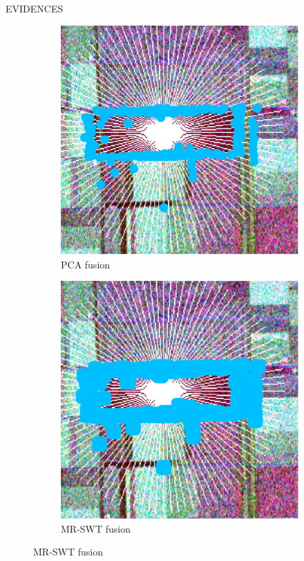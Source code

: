 \documentclass[final]{beamer}
\newlength{\onecolwid}
\newlength{\threecolwid}
\begin{document}
\begin{frame}[t]
\begin{columns}[t,totalwidth=\threecolwid]
\begin{column}{\onecolwid}
\begin{block}{\LARGE{EVIDENCES}}
\begin{figure}[hbt]
\begin{subfigure}{0.33\linewidth}
    \includegraphics[width=\linewidth]{figures/pca_1.pdf}
    \caption{\large{PCA fusion}}
  \end{subfigure}
  \begin{subfigure}{0.32\linewidth}
    \centering
    \includegraphics[width=\linewidth]{figures/swt.pdf}
    \caption{\large{MR-SWT fusion}}
  \end{subfigure}
  \end{figure}
	

\end{block}
\end{column}
\end{columns}
\end{frame}
\end{document}
